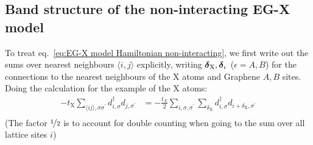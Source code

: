 \subsection{Band structure of the non-interacting EG-X model}\label{subsec:band-structure-of-the-non-interacting-eg-x-model}

To treat eq.~\ref{eq:EG-X model Hamiltonian non-interacting}, we first write out the sums over nearest neighbours \(\langle i, j \rangle\) explicitly, writing \(\bm{\mathrm{\delta}}_{\mathrm{X}}, \bm{\mathrm{\delta}}_{\epsilon}\) (\(\epsilon = A, B\)) for the connections to the nearest neighbours of the \(\mathrm{X}\) atoms and Graphene \(A, B\) sites.
Doing the calculation for the example of the \(\mathrm{X}\) atoms:
\begin{align}
    -t_{\mathrm{X}} \sum_{\langle ij \rangle, \sigma \sigma^{\prime}} d_{i, \sigma}^{\dagger} d_{j, \sigma^{\prime}}
    &= -\frac{t_X}{2} \sum_{i,\sigma, \sigma^{\prime}} \sum_{\delta_{\mathrm{X}}} d_{i, \sigma}^{\dagger} d_{i + \delta_{\mathrm{X}}, \sigma^{\prime}} \label{eq:EG-X model X atoms nearest neighbours written out} \\
\end{align}
(The factor \(\nicefrac{1}{2}\) is to account for double counting when going to the sum over all lattice sites \(i\))

